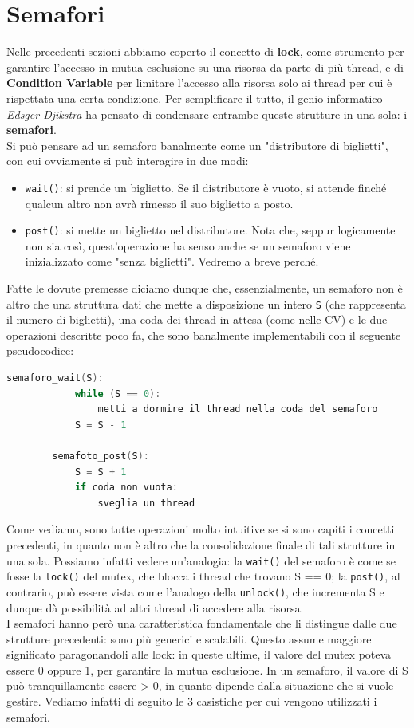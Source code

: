 \documentclass[12pt]{report}
\begin{document}
	\section{Semafori}
	Nelle precedenti sezioni abbiamo coperto il concetto di \textbf{lock}, come strumento per garantire l'accesso in mutua esclusione su una risorsa da parte di più thread, e di \textbf{Condition Variable} per limitare l'accesso alla risorsa solo ai thread per cui è rispettata una certa condizione. Per semplificare il tutto, il genio informatico \textit{Edsger Djikstra} ha pensato di condensare entrambe queste strutture in una sola: i \textbf{semafori}.\\
	Si può pensare ad un semaforo banalmente come un "distributore di biglietti", con cui ovviamente si può interagire in due modi:
	\begin{itemize}
		\item \texttt{wait()}: si prende un biglietto. Se il distributore è vuoto, si attende finché qualcun altro non avrà rimesso il suo biglietto a posto.
		
		\item \texttt{post()}: si mette un biglietto nel distributore. Nota che, seppur logicamente non sia così, quest'operazione ha senso anche se un semaforo viene inizializzato come "senza biglietti". Vedremo a breve perché.
	\end{itemize}
	
	Fatte le dovute premesse diciamo dunque che, essenzialmente, un semaforo non è altro che una struttura dati che mette a disposizione un intero \texttt{S} (che rappresenta il numero di biglietti), una coda dei thread in attesa (come nelle CV) e le due operazioni descritte poco fa, che sono banalmente implementabili con il seguente pseudocodice:
	\begin{lstlisting}[language=C]
		semaforo_wait(S):
			while (S == 0):
				metti a dormire il thread nella coda del semaforo
			S = S - 1
			
		semafoto_post(S):
			S = S + 1
			if coda non vuota:
				sveglia un thread
	\end{lstlisting}
	Come vediamo, sono tutte operazioni molto intuitive se si sono capiti i concetti precedenti, in quanto non è altro che la consolidazione finale di tali strutture in una sola. Possiamo infatti vedere un'analogia: la \texttt{wait()} del semaforo è come se fosse la \texttt{lock()} del mutex, che blocca i thread che trovano S == 0; la \texttt{post()}, al contrario, può essere vista come l'analogo della \texttt{unlock()}, che incrementa S e dunque dà possibilità ad altri thread di accedere alla risorsa.\\
	I semafori hanno però una caratteristica fondamentale che li distingue dalle due strutture precedenti: sono più generici e scalabili. Questo assume maggiore significato paragonandoli alle lock: in queste ultime, il valore del mutex poteva essere 0 oppure 1, per garantire la mutua esclusione. In un semaforo, il valore di S può tranquillamente essere > 0, in quanto dipende dalla situazione che si vuole gestire. Vediamo infatti di seguito le 3 casistiche per cui vengono utilizzati i semafori.
	
\end{document}
